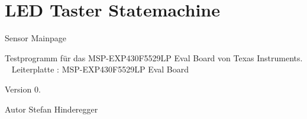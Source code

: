 \chapter{LED Taster Statemachine }
\hypertarget{index}{}\label{index}
\label{index_mango}%
%
Sensor Mainpage

Testprogramm für das MSP-\/\+EXP430\+F5529\+LP Eval Board von Texas Instruments. ~\newline
 Leiterplatte :\+ MSP-\/\+EXP430\+F5529\+LP Eval Board

\begin{DoxyVersion}{Version}
0.
\end{DoxyVersion}
\begin{DoxyAuthor}{Autor}
Stefan Hinderegger 
\end{DoxyAuthor}
